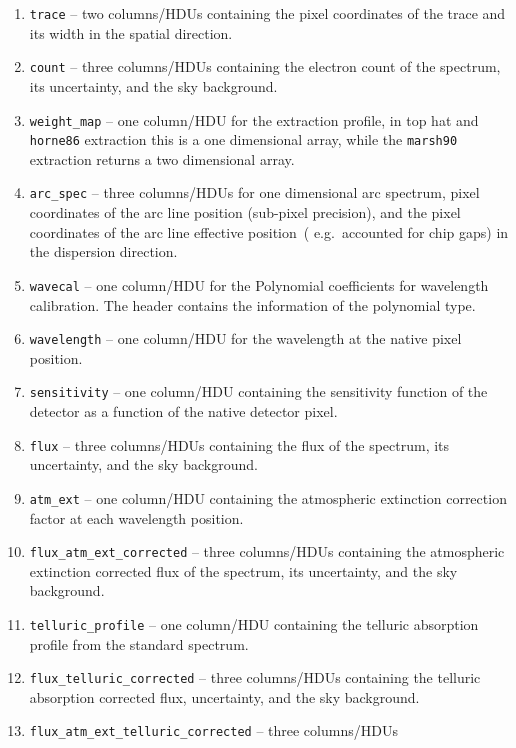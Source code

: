 \documentclass[linenumbers, twocolumn]{aastex631}
\begin{document}
\begin{enumerate}
    \item \texttt{trace} -- two columns/HDUs containing the pixel coordinates
    of the trace and its width in the spatial direction.
    \item \texttt{count} -- three columns/HDUs containing the electron count
    of the spectrum, its uncertainty, and the sky background.
    \item \texttt{weight\_map} -- one column/HDU for the extraction profile,
    in top hat and \texttt{horne86} extraction this is a one dimensional array,
    while the \texttt{marsh90} extraction returns a two dimensional array.
    \item \texttt{arc\_spec} -- three columns/HDUs for one dimensional arc
    spectrum, pixel coordinates of the arc line position (sub-pixel precision),
    and the pixel coordinates of the arc line effective position~(
    e.g.\ accounted for chip gaps) in the dispersion direction.
    \item \texttt{wavecal} -- one column/HDU for the Polynomial coefficients
    for wavelength calibration. The header contains the information of the
    polynomial type.
    \item \texttt{wavelength} -- one column/HDU for the wavelength at the
    native pixel position.
    \item \texttt{sensitivity} -- one column/HDU containing the sensitivity
    function of the detector as a function of the native detector pixel.
    \item \texttt{flux} -- three columns/HDUs containing the
    flux of the spectrum, its uncertainty, and the sky background.
    \item \texttt{atm\_ext} -- one column/HDU containing the atmospheric
    extinction correction factor at each wavelength position.
    \item \texttt{flux\_atm\_ext\_corrected} -- three columns/HDUs containing
    the atmospheric extinction corrected flux of the spectrum, its
    uncertainty, and the sky background.
    \item \texttt{telluric\_profile} -- one column/HDU containing the telluric
    absorption profile from the standard spectrum.
    \item \texttt{flux\_telluric\_corrected} -- three columns/HDUs containing
    the telluric absorption corrected flux, uncertainty, and the sky
    background.
    \item \texttt{flux\_atm\_ext\_telluric\_corrected} -- three columns/HDUs

\end{enumerate}
\end{document}
